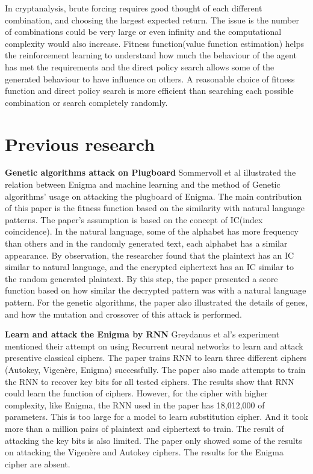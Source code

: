 In cryptanalysis, brute forcing requires good thought of each different combination, and choosing the largest expected return. The issue is the number of combinations could be very large or even infinity and the computational complexity would also increase. Fitness function(value function estimation) helps the reinforcement learning to understand how much the behaviour of the agent has met the requirements and the direct policy search allows some of the generated behaviour to have influence on others. A reasonable choice of fitness function and direct policy search is more efficient than searching each possible combination or search completely randomly.

\section{Previous research}
\noindent\textbf{Genetic algorithms attack on Plugboard} \qquad		Sommervoll et al \cite{sommervoll2021genetic} illustrated the relation between Enigma and machine learning and the method of Genetic algorithms’ usage on attacking the plugboard of Enigma. The main contribution of this paper is the fitness function based on the similarity with natural language patterns. The paper’s assumption is based on the concept of IC(index coincidence). In the natural language, some of the alphabet has more frequency than others and in the randomly generated text, each alphabet has a similar appearance. By observation, the researcher found that the plaintext has an IC similar to natural language, and the encrypted ciphertext has an IC similar to the random generated plaintext. By this step, the paper presented a score function based on how similar the decrypted pattern was with a natural language pattern. For the genetic algorithms, the paper also illustrated the details of genes, and how the mutation and crossover of this attack is performed.

\noindent\textbf{Learn and attack the Enigma by RNN} \qquad		Greydanus et al’s \cite{greydanus2017learning} experiment mentioned their attempt on using Recurrent neural networks to learn and attack presentive classical ciphers. The paper trains RNN to learn three different ciphers (Autokey, Vigenère, Enigma) successfully. The paper also made attempts to train the RNN to recover key bits for all tested ciphers. The results show that RNN could learn the function of ciphers. However, for the cipher with higher complexity, like Enigma, the RNN used in the paper has 18,012,000 of parameters. This is too large for a model to learn substitution cipher. And it took more than a million pairs of plaintext and ciphertext to train. The result of attacking the key bits is also limited. The paper only showed some of the results on attacking the Vigenère and Autokey ciphers. The results for the Enigma cipher are absent.



